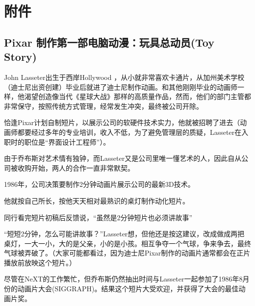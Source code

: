 \hypertarget{ux9644ux4ef6}{%
\section{附件}\label{ux9644ux4ef6}}

\hypertarget{pixar-ux5236ux4f5cux7b2cux4e00ux90e8ux7535ux8111ux52a8ux6f2bux73a9ux5177ux603bux52a8ux5458toy-story}{%
\subsection{Pixar 制作第一部电脑动漫：玩具总动员(Toy
Story)}\label{pixar-ux5236ux4f5cux7b2cux4e00ux90e8ux7535ux8111ux52a8ux6f2bux73a9ux5177ux603bux52a8ux5458toy-story}}



John Lasseter出生于西岸Hollywood ，从小就非常喜欢卡通片，从加州美术学校（迪士尼出资创建）毕业后就进了迪士尼制作动画。和其他刚刚毕业的动画师一样，他渴望创造像当代《星球大战》那样的高质量作品，然而，他们的部门主管都非常保守，按照传统方式管理，经常发生冲突，最终被公司开除。

恰逢Pixar计划自制短片，以展示公司的软硬件技术实力，他就被招聘了进去（动画师都要经过多年的专业培训，收入不低，为了避免管理层的质疑，Lasseter在入职时的职位是“界面设计工程师”）。

由于乔布斯对艺术情有独钟，而Lasseter又是公司里唯一懂艺术的人，因此自从公司被收购开始，两人的合作一直非常默契。

1986年，公司决策要制作2分钟动画片展示公司的最新3D技术。

他就按自己所长，按他天天相对最熟识的桌灯制作动化短片。

同行看完短片初稿后反馈说，``虽然是2分钟短片也必须讲故事''

“短短2分钟，怎么可能讲故事？”Lasseter想，但他还是按这建议，改成做成两把桌灯，一大一小，大的是父亲，小的是小孩。相互争夺一个气球，争来争去，最终气球被弄破了。（大家可能都看过，因为迪士尼Pixar制作的动画片通常都会在正片播放前放映这个短片。）

尽管在NeXT的工作繁忙，但乔布斯仍然抽出时间与Lasseter一起参加了1986年8月份的动画片大会(SIGGRAPH)。结果这个短片大受欢迎，并获得了大会的最佳动画片奖。



